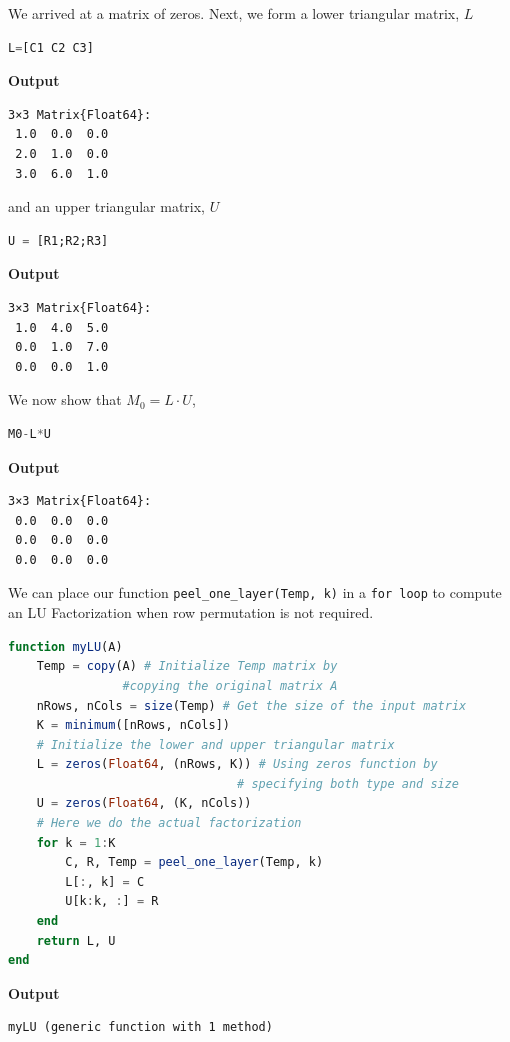 We arrived at a matrix of zeros. Next, we form a lower triangular matrix, $L$\\

\begin{lstlisting}[language=Julia,style=mystyle]
L=[C1 C2 C3]
\end{lstlisting}
\textbf{Output} 
\begin{verbatim}
3×3 Matrix{Float64}:
 1.0  0.0  0.0
 2.0  1.0  0.0
 3.0  6.0  1.0
\end{verbatim}

and an upper triangular matrix, $U$\\
\begin{lstlisting}[language=Julia,style=mystyle]
U = [R1;R2;R3]
\end{lstlisting}
\textbf{Output} 
\begin{verbatim}
3×3 Matrix{Float64}:
 1.0  4.0  5.0
 0.0  1.0  7.0
 0.0  0.0  1.0
\end{verbatim}

We now show that $M_0 = L \cdot U$,\\

\begin{lstlisting}[language=Julia,style=mystyle]
M0-L*U
\end{lstlisting}
\textbf{Output} 
\begin{verbatim}
3×3 Matrix{Float64}:
 0.0  0.0  0.0
 0.0  0.0  0.0
 0.0  0.0  0.0
\end{verbatim}

We can place our function \texttt{peel\_one\_layer(Temp, k)} in a \texttt{for\,loop} to compute an LU Factorization when row permutation is not required.

\begin{lstlisting}[language=Julia,style=mystyle]
function myLU(A)
    Temp = copy(A) # Initialize Temp matrix by 
                #copying the original matrix A
    nRows, nCols = size(Temp) # Get the size of the input matrix
    K = minimum([nRows, nCols])
    # Initialize the lower and upper triangular matrix
    L = zeros(Float64, (nRows, K)) # Using zeros function by
                                # specifying both type and size
    U = zeros(Float64, (K, nCols)) 
    # Here we do the actual factorization
    for k = 1:K
        C, R, Temp = peel_one_layer(Temp, k)
        L[:, k] = C
        U[k:k, :] = R
    end
    return L, U
end
\end{lstlisting}
\textbf{Output} 
\begin{verbatim}
myLU (generic function with 1 method)
\end{verbatim}


